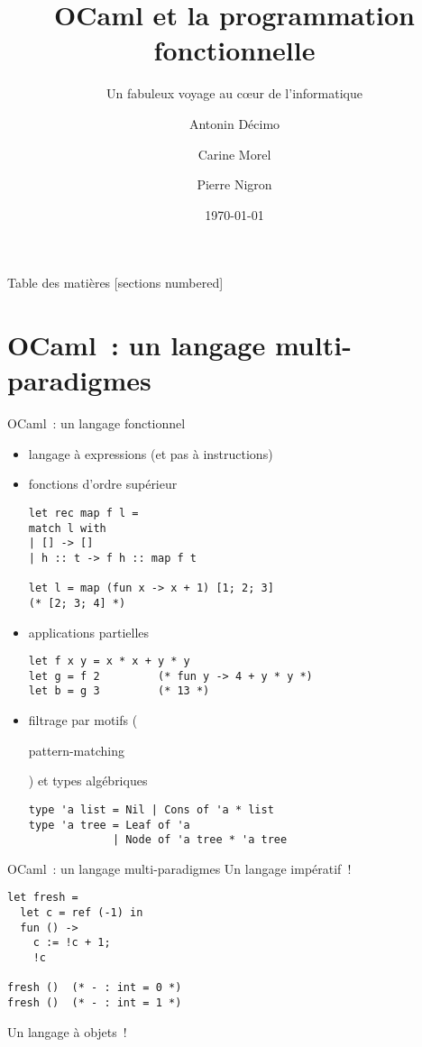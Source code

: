 \documentclass[10pt]{beamer}
\title{OCaml et la programmation fonctionnelle}
\subtitle{Un fabuleux voyage au cœur de l’informatique}
\date{\today}
\author{Antonin Décimo \and Carine Morel \and Pierre Nigron}
\institute{Université Paris Diderot}
\begin{document}
\maketitle

\begin{frame}{Table des matières}
  [sections numbered]
  \tableofcontents[hideallsubsections]
\end{frame}

\section{OCaml~: un langage multi-paradigmes}

\begin{frame}[fragile]{OCaml~: un langage fonctionnel}
  \begin{itemize}
  \item<1-> langage à expressions (et pas à instructions)
  \item<2-> fonctions d'ordre supérieur
\begin{verbatim}
let rec map f l =
match l with
| [] -> []
| h :: t -> f h :: map f t

let l = map (fun x -> x + 1) [1; 2; 3]
(* [2; 3; 4] *)
\end{verbatim}
  \item<3-> applications partielles
\begin{verbatim}
let f x y = x * x + y * y
let g = f 2         (* fun y -> 4 + y * y *)
let b = g 3         (* 13 *)
\end{verbatim}
  \item<4-> filtrage par motifs
    (\begin{english}pattern-matching\end{english}) et types
    algébriques
\begin{verbatim}
type 'a list = Nil | Cons of 'a * list
type 'a tree = Leaf of 'a
             | Node of 'a tree * 'a tree
\end{verbatim}
  \end{itemize}
\end{frame}

\begin{frame}[fragile]{OCaml~: un langage multi-paradigmes}
  Un langage impératif~!
\begin{verbatim}
let fresh =
  let c = ref (-1) in
  fun () ->
    c := !c + 1;
    !c

fresh ()  (* - : int = 0 *)
fresh ()  (* - : int = 1 *)
\end{verbatim}

  Un langage à objets~!
\end{frame}
\end{document}
